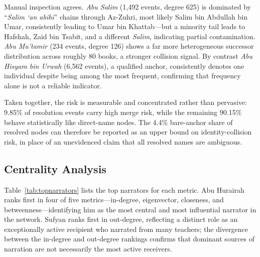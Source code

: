 \documentclass[conference]{IEEEtran}
\begin{document}
Manual inspection agrees. \textit{Abu Salim} (1{,}492 events, degree 625) is
dominated by ``\textit{Salim `an abihi}'' chains through Az-Zuhri, most likely
Salim bin Abdullah bin Umar, consistently leading to Umar bin Khattab---but a
minority tail leads to Hafshah, Zaid bin Tsabit, and a different \textit{Salim},
indicating partial contamination. \textit{Abu Mu'tamir} (234 events, degree 126)
shows a far more heterogeneous successor distribution across roughly 80 books, a
stronger collision signal. By contrast \textit{Abu Hisyam bin Urwah} (6{,}562
events), a qualified anchor, consistently denotes one individual despite being
among the most frequent, confirming that frequency alone is not a reliable
indicator.

Taken together, the risk is measurable and concentrated rather than pervasive:
9.85\% of resolution events carry high merge risk, while the remaining 90.15\%
behave statistically like direct-name nodes. The 4.4\% bare-anchor share of
resolved nodes can therefore be reported as an upper bound on identity-collision
risk, in place of an unevidenced claim that all resolved names are ambiguous.

\subsection{Centrality Analysis}

Table~\ref{tab:topnarrators} lists the top narrators for each metric. Abu
Hurairah ranks first in four of five metrics---in-degree, eigenvector, closeness,
and betweenness---identifying him as the most central and most influential
narrator in the network. Sufyan ranks first in out-degree, reflecting a distinct
role as an exceptionally active recipient who narrated from many teachers; the
divergence between the in-degree and out-degree rankings confirms that dominant
sources of narration are not necessarily the most active receivers.
\end{document}
